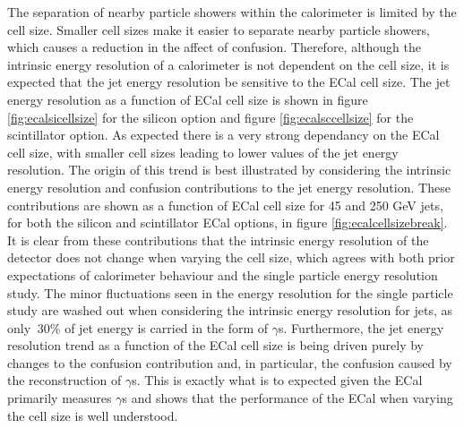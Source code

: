 The separation of nearby particle showers within the calorimeter is limited by the cell size.  Smaller cell sizes make it easier to separate nearby particle showers, which causes a reduction in the affect of confusion.  Therefore, although the intrinsic energy resolution of a calorimeter is not dependent on the cell size, it is expected that the jet energy resolution be sensitive to the ECal cell size.  The jet energy resolution as a function of ECal cell size is shown in figure \ref{fig:ecalsicellsize} for the silicon option and figure \ref{fig:ecalsccellsize} for the scintillator option.  As expected there is a very strong dependancy on the ECal cell size, with smaller cell sizes leading to lower values of the jet energy resolution.  The origin of this trend is best illustrated by considering the intrinsic energy resolution and confusion contributions to the jet energy resolution.  These contributions are shown as a function of ECal cell size for 45 and 250 GeV jets, for both the silicon and scintillator ECal options, in figure \ref{fig:ecalcellsizebreak}.  It is clear from these contributions that the intrinsic energy resolution of the detector does not change when varying the cell size, which agrees with both prior expectations of calorimeter behaviour and the single particle energy resolution study.  The minor fluctuations seen in the energy resolution for the single particle study are washed out when considering the intrinsic energy resolution for jets, as only $~30\%$ of jet energy is carried in the form of $\gamma$s.  Furthermore, the jet energy resolution trend as a function of the ECal cell size is being driven purely by changes to the confusion contribution and, in particular, the confusion caused by the reconstruction of $\gamma$s.  This is exactly what is to expected given the ECal primarily measures $\gamma$s and shows that the performance of the ECal when varying the cell size is well understood.

